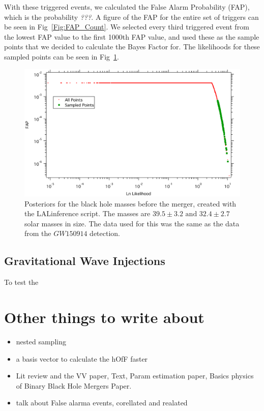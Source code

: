 \documentclass{article}
\begin{document}
 
 With these triggered events, we calculated the False Alarm Probability (FAP), which is the probability \textit{???}. A figure of the FAP for the entire set of triggers can be seen in Fig~\ref{Fig:FAP_Count}. We selected every third triggered event from the lowest FAP value to the first 1000th FAP value, and used these as the sample points that we decided to calculate the Bayes Factor for. The likelihoods for these sampled points can be seen in Fig~\ref{Fig:sampledPts}.

       \begin{figure}[h]
       	\centering
       	\includegraphics[width=1\textwidth]{Figures/sampledPts.pdf} 
       	\caption{Posteriors for the black hole masses before the merger, created with the LALinference script. The masses are $39.5\pm3.2 \text{ and } 32.4\pm2.7$ solar masses in size. The data used for this was the same as the data from the $GW150914$ detection.}
       	\label{Fig:sampledPts}
       \end{figure}
       
       
       
 
 
 \subsection{Gravitational Wave Injections }
 To test the 
 
\section{Other things to write about}
 
 \begin{itemize}
 	\item nested sampling 
 	\item a basis vector to calculate the hOfF faster
 	\item  Lit review and the VV paper, Text, Param estimation paper, Basics physics of Binary Black Hole Mergers Paper.
	\item  talk about False alarma events, corellated and realated
 \end{itemize}
 
\end{document}

